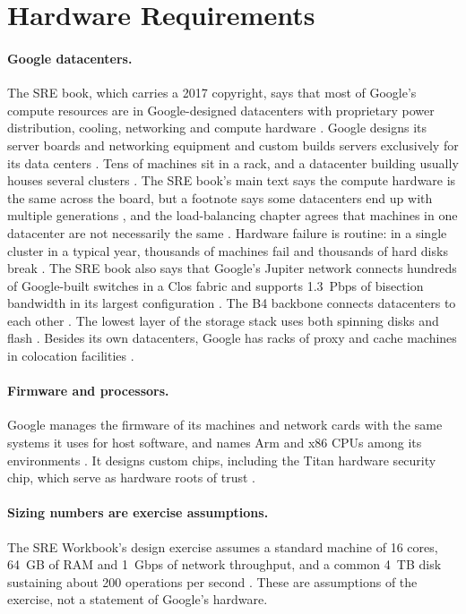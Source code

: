 \section{Hardware Requirements}\label{sec:hardware}

\paragraph{Google datacenters.}
The SRE book, which carries a 2017 copyright, says that most of Google's compute resources are in Google-designed datacenters with proprietary power distribution, cooling, networking and compute hardware \cite{sre-book}. Google designs its server boards and networking equipment \cite{docs-cloud-google-docs-security-infrastructure-design} and custom builds servers exclusively for its data centers \cite{datacenters}. Tens of machines sit in a rack, and a datacenter building usually houses several clusters \cite{sre-book}. The SRE book's main text says the compute hardware is the same across the board, but a footnote says some datacenters end up with multiple generations \cite{sre-book}, and the load-balancing chapter agrees that machines in one datacenter are not necessarily the same \cite{sre-book}. Hardware failure is routine: in a single cluster in a typical year, thousands of machines fail and thousands of hard disks break \cite{sre-book}. The SRE book also says that Google's Jupiter network connects hundreds of Google-built switches in a Clos fabric and supports 1.3~Pbps of bisection bandwidth in its largest configuration \cite{sre-book}. The B4 backbone connects datacenters to each other \cite{sre-book}. The lowest layer of the storage stack uses both spinning disks and flash \cite{sre-book}. Besides its own datacenters, Google has racks of proxy and cache machines in colocation facilities \cite{workbook}.

\paragraph{Firmware and processors.}
Google manages the firmware of its machines and network cards with the same systems it uses for host software, and names Arm and x86 CPUs among its environments \cite{bsrs}. It designs custom chips, including the Titan hardware security chip, which serve as hardware roots of trust \cite{docs-cloud-google-docs-security-infrastructure-design}.

\paragraph{Sizing numbers are exercise assumptions.}
The SRE Workbook's design exercise assumes a standard machine of 16 cores, 64~GB of RAM and 1~Gbps of network throughput, and a common 4~TB disk sustaining about 200 operations per second \cite{workbook}. These are assumptions of the exercise, not a statement of Google's hardware.

